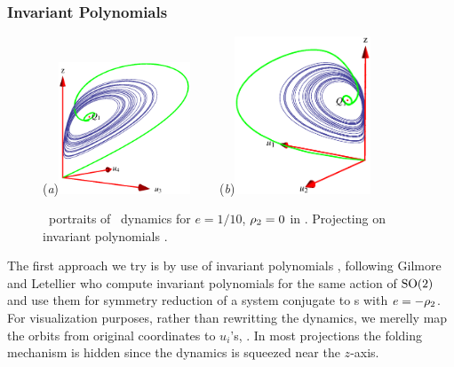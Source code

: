 \subsubsection{Invariant Polynomials}


\begin{figure}[ht]
\begin{center}
  (\textit{a})\includegraphics[width=0.35\textwidth]{../figs/CLEip1}
~~~~(\textit{b})\includegraphics[width=0.36\textwidth]{../figs/CLEip2}
\end{center}
\caption[Orbit space projection of Complex Lorenz flow: Invariant polynomials]{ \Statesp\
portraits of \CLe\ dynamics for $e=1/10$, $\rho_2=0$
in \reducedsp. Projecting on invariant polynomials .
    }
\label{fig:CLEip}
\end{figure}

The first approach we try is by use of invariant polynomials ,
following Gilmore and Letellier\rf{GL-Gil07b} who compute invariant polynomials
for the same action of $\mathrm{SO}(2)$ and use them for symmetry reduction
of a system conjugate to \CLe s with $e=-\rho_2$.
For visualization purposes, rather than rewritting the dynamics,
we merelly map the orbits from original coordinates to $u_i$'s, .
In most projections the folding mechanism is hidden since the dynamics is squeezed near the $z$-axis.

